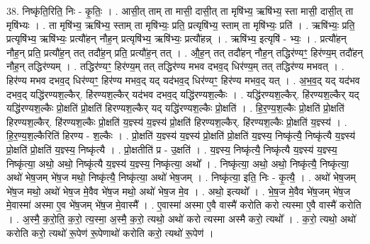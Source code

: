\documentclass[17pt]{extarticle}
\begin{document}
38. निष्कृ॑ति॒रिति॒ निः - कृ॒तिः॒ । . आसी॒त् ताम् ता मासी॒ दासी॒त् ता मृषि॑भ्य॒ ऋषि॑भ्य॒ स्ता मासी॒ दासी॒त् ता मृषि॑भ्यः । . ता मृषि॑भ्य॒ ऋषि॑भ्य॒ स्ताम् ता मृषि॑भ्यः॒ प्रति॒ प्रत्यृषि॑भ्य॒ स्ताम् ता मृषि॑भ्यः॒ प्रति॑ । . ऋषि॑भ्यः॒ प्रति॒ प्रत्यृषि॑भ्य॒ ऋषि॑भ्यः॒ प्रत्यौ॑हन् नौह॒न् प्रत्यृषि॑भ्य॒ ऋषि॑भ्यः॒ प्रत्यौ॑हन्न् । . ऋषि॑भ्य॒ इत्यृषि॑ - भ्यः॒ । . प्रत्यौ॑हन् नौह॒न् प्रति॒ प्रत्यौ॑ह॒न् तत् तदौ॑ह॒न् प्रति॒ प्रत्यौ॑ह॒न् तत् । . औ॒ह॒न् तत् तदौ॑हन् नौह॒न् तद्धिर॑ण्यꣳ॒॒ हिर॑ण्य॒म् तदौ॑हन् नौह॒न् तद्धिर॑ण्यम् । . तद्धिर॑ण्यꣳ॒॒ हिर॑ण्य॒म् तत् तद्धिर॑ण्य मभव दभव॒द् धिर॑ण्य॒म् तत् तद्धिर॑ण्य मभवत् । . हिर॑ण्य मभव दभव॒द् धिर॑ण्यꣳ॒॒ हिर॑ण्य मभव॒द् यद् यद॑भव॒द् धिर॑ण्यꣳ॒॒ हिर॑ण्य मभव॒द् यत् । . अ॒भ॒व॒द् यद् यद॑भव दभव॒द् यद्धि॑रण्यश॒ल्कैर्. हि॑रण्यश॒ल्कैर् यद॑भव दभव॒द् यद्धि॑रण्यश॒ल्कैः । . यद्धि॑रण्यश॒ल्कैर्. हि॑रण्यश॒ल्कैर् यद् यद्धि॑रण्यश॒ल्कैः प्रो॒क्षति॑ प्रो॒क्षति॑ हिरण्यश॒ल्कैर् यद् यद्धि॑रण्यश॒ल्कैः प्रो॒क्षति॑ । . हि॒र॒ण्य॒श॒ल्कैः प्रो॒क्षति॑ प्रो॒क्षति॑ हिरण्यश॒ल्कैर्. हि॑रण्यश॒ल्कैः प्रो॒क्षति॑ य॒ज्ञ्स्य॑ य॒ज्ञ्स्य॑ प्रो॒क्षति॑ हिरण्यश॒ल्कैर्. हि॑रण्यश॒ल्कैः प्रो॒क्षति॑ य॒ज्ञ्स्य॑ । . हि॒र॒ण्य॒श॒ल्कैरिति॑ हिरण्य - श॒ल्कैः । . प्रो॒क्षति॑ य॒ज्ञ्स्य॑ य॒ज्ञ्स्य॑ प्रो॒क्षति॑ प्रो॒क्षति॑ य॒ज्ञ्स्य॒ निष्कृ॑त्यै॒ निष्कृ॑त्यै य॒ज्ञ्स्य॑ प्रो॒क्षति॑ प्रो॒क्षति॑ य॒ज्ञ्स्य॒ निष्कृ॑त्यै । . प्रो॒क्षतीति॑ प्र - उ॒क्षति॑ । . य॒ज्ञ्स्य॒ निष्कृ॑त्यै॒ निष्कृ॑त्यै य॒ज्ञ्स्य॑ य॒ज्ञ्स्य॒ निष्कृ॑त्या॒ अथो॒ अथो॒ निष्कृ॑त्यै य॒ज्ञ्स्य॑ य॒ज्ञ्स्य॒ निष्कृ॑त्या॒ अथो᳚ । . निष्कृ॑त्या॒ अथो॒ अथो॒ निष्कृ॑त्यै॒ निष्कृ॑त्या॒ अथो॑ भेष॒जम् भे॑ष॒ज मथो॒ निष्कृ॑त्यै॒ निष्कृ॑त्या॒ अथो॑ भेष॒जम् । . निष्कृ॑त्या॒ इति॒ निः - कृ॒त्यै॒ । . अथो॑ भेष॒जम् भे॑ष॒ज मथो॒ अथो॑ भेष॒ज मे॒वैव भे॑ष॒ज मथो॒ अथो॑ भेष॒ज मे॒व । . अथो॒ इत्यथो᳚ । . भे॒ष॒ज मे॒वैव भे॑ष॒जम् भे॑ष॒ज मे॒वास्मा॑ अस्मा ए॒व भे॑ष॒जम् भे॑ष॒ज मे॒वास्मै᳚ । . ए॒वास्मा॑ अस्मा ए॒वै वास्मै॑ करोति करो त्यस्मा ए॒वै वास्मै॑ करोति । . अ॒स्मै॒ क॒रो॒ति॒ क॒रो॒ त्य॒स्मा॒ अ॒स्मै॒ क॒रो॒ त्यथो॒ अथो॑ करो त्यस्मा अस्मै करो॒ त्यथो᳚ । . क॒रो॒ त्यथो॒ अथो॑ करोति करो॒ त्यथो॑ रू॒पेण॑ रू॒पेणाथो॑ करोति करो॒ त्यथो॑ रू॒पेण॑ । \newline
\pagebreak
{}
\end{document}
